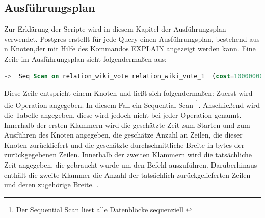 \subsection{Ausführungsplan}
Zur Erklärung der Scripte wird in diesem Kapitel der Ausführungsplan verwendet. Postgres erstellt für jede Query einen Ausführungsplan, bestehend aus n Knoten,der mit Hilfe des Kommandos
EXPLAIN angezeigt werden kann. Eine Zeile im Ausführungsplan sieht folgendermaßen aus:
\begin{lstlisting}[language=SQL,caption = Zeile im Ausführungsplan,frame=single, label={lineInQueryPlan} ]
    ->  Seq Scan on relation_wiki_vote relation_wiki_vote_1  (cost=10000000000.00..10000001649.62 rows=100762 width=8) (actual time=0.002..4.758 rows=100762 loops=1)
\end{lstlisting}
Diese Zeile entspricht einem Knoten und ließt sich folgendermaßen: Zuerst wird die Operation angegeben. In diesem Fall ein Sequential Scan \footnote{Der Sequential Scan liest alle Datenblöcke sequenziell
\cite[S.211]{froehlich01}}. Anschließend wird die Tabelle angegeben, diese wird jedoch nicht bei jeder Operation genannt. Innerhalb der ersten Klammern wird die geschätzte
Zeit zum Starten und zum Ausführen des Knoten angegeben, die geschätze Anzahl an Zeilen, die dieser Knoten zurückliefert und die geschätzte durchschnittliche Breite
in bytes der zurückgegebenen Zeilen. Innerhalb der zweiten Klammern wird die tatsächliche Zeit angegeben, die gebraucht wurde um den Befehl auszuführen. Darüberhinaus
enthält die zweite Klammer die Anzahl der tatsächlich zurückgelieferten Zeilen und deren zugehörige Breite.
\cite{postgresQueryPlan}.

